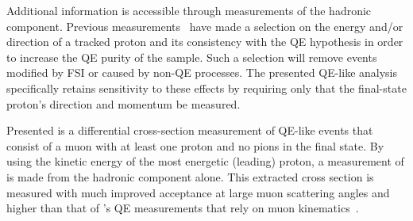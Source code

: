 Additional information is accessible through measurements of the 
hadronic component. Previous 
measurements~\cite{Gran:2006jn,Espinal:2007zz,Lyubushkin:2008pe,Nakajima:2011zz} 
have made a selection on the energy and/or direction of a tracked proton and 
its consistency with the QE hypothesis in order to increase the QE purity of 
the sample. Such a selection will remove events modified by FSI or caused by 
non-QE processes. The presented QE-like analysis specifically retains 
sensitivity to these effects by requiring only that the final-state proton's 
direction and momentum be measured.

Presented is a differential cross-section measurement of QE-like events
that consist of a muon with at least one proton and no pions in the final state. 
By using the kinetic energy of the most energetic (leading) proton, a measurement 
of \QSq is made from the hadronic component alone. This extracted cross section 
is measured with much improved acceptance at large muon scattering angles and 
higher \QSq than that of \minerva's QE measurements that rely on muon 
kinematics~\cite{Fields:2013zhk,Fiorentini:2013ezn}. 


